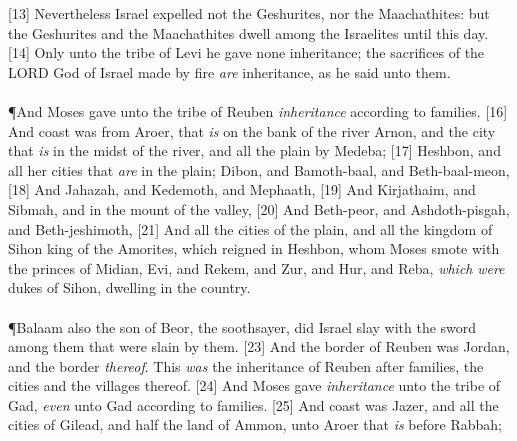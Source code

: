 [13] \textcolor[cmyk]{0.99998,1,0,0}{Nevertheless   Israel expelled not the Geshurites, nor the Maachathites: but the Geshurites and the Maachathites dwell among the Israelites until this day.}
[14] \textcolor[cmyk]{0.99998,1,0,0}{Only unto the tribe of Levi he gave none inheritance; the sacrifices of the LORD God of Israel made by fire \emph{are}   inheritance, as he said unto them.}\\
\\
\P  \textcolor[cmyk]{0.99998,1,0,0}{And Moses gave unto the tribe of   Reuben \emph{inheritance} according to   families.}
[16] \textcolor[cmyk]{0.99998,1,0,0}{And   coast was from Aroer, that \emph{is} on the bank of the river Arnon, and the city that \emph{is} in the midst of the river, and all the plain by Medeba;}
[17] \textcolor[cmyk]{0.99998,1,0,0}{Heshbon, and all her cities that \emph{are} in the plain; Dibon, and Bamoth-baal, and Beth-baal-meon,}
[18] \textcolor[cmyk]{0.99998,1,0,0}{And Jahazah, and Kedemoth, and Mephaath,}
[19] \textcolor[cmyk]{0.99998,1,0,0}{And Kirjathaim, and Sibmah, and  in the mount of the valley,}
[20] \textcolor[cmyk]{0.99998,1,0,0}{And Beth-peor, and Ashdoth-pisgah, and Beth-jeshimoth,}
[21] \textcolor[cmyk]{0.99998,1,0,0}{And all the cities of the plain, and all the kingdom of Sihon king of the Amorites, which reigned in Heshbon, whom Moses smote with the princes of Midian, Evi, and Rekem, and Zur, and Hur, and Reba, \emph{which} \emph{were} dukes of Sihon, dwelling in the country.}\\
\\
\P  \textcolor[cmyk]{0.99998,1,0,0}{Balaam also the son of Beor, the soothsayer, did   Israel slay with the sword among them that were slain by them.}
[23] \textcolor[cmyk]{0.99998,1,0,0}{And the border of   Reuben was Jordan, and the border \emph{thereof}. This \emph{was} the inheritance of    Reuben after   families, the cities and the villages thereof.}
[24] \textcolor[cmyk]{0.99998,1,0,0}{And Moses gave \emph{inheritance} unto the tribe of Gad, \emph{even} unto   Gad according to   families.}
[25] \textcolor[cmyk]{0.99998,1,0,0}{And   coast was Jazer, and all the cities of Gilead, and half the land of   Ammon, unto Aroer that \emph{is} before Rabbah;}\

